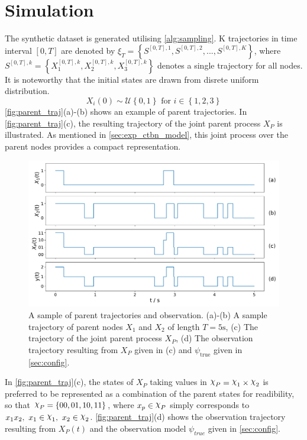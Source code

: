 \section{Simulation}
\label{sec:simulation}
The synthetic dataset is generated utilising \cref{alg:sampling}. K trajectories in time interval $ [0, T] $ are denoted by $ \xi_T = \left\lbrace S^{[0,T], 1}, S^{[0,T], 2}, ..., S^{[0,T], K} \right\rbrace  $, where $ S^{[0,T],k} = \left\lbrace X_1^{[0,T],k} , X_2^{[0,T],k}, X_3^{[0,T],k}\right\rbrace $ denotes a single trajectory for all nodes. It is noteworthy that the initial states are drawn from disrete uniform distribution.
\begin{equation}
X_i(0) \sim \mathcal{U} \left\lbrace 0, 1\right\rbrace  \text{ for } i \in \left\lbrace 1,2,3\right\rbrace 
\end{equation}
\autoref{fig:parent_traj}(a)-(b) shows an example of parent trajectories. In \autoref{fig:parent_traj}(c), the resulting trajectory of the joint parent process $ X_P $ is illustrated. As mentioned in \cref{sec:exp_ctbn_model}, this joint process over the parent nodes provides a compact representation. 
\begin{figure}[H]
	\begin{center}
		\includegraphics[width=.90\textwidth]{figures/sim_example/parent_traj}
		\caption[A sample of parent trajectories and observation]{A sample of parent trajectories and observation. (a)-(b) A sample trajectory of parent nodes $ X_1 $ and $ X_2 $ of length $ T=5\text{s} $, (c) The trajectory of the joint parent process $ X_P $, (d) The observation trajectory resulting from $ X_P $ given in (c) and $ \psi_{\text{true}} $ given in \cref{sec:config}.}
		\label{fig:parent_traj}
	\end{center}
\end{figure}
In \autoref{fig:parent_traj}(c), the states of $ X_P $ taking values in $ \rchi_P = \rchi_1 \times \rchi_2 $ is preferred to be represented as a combination of the parent states for readibility, so that $ \rchi_P = \left\lbrace 00, 01, 10, 11\right\rbrace  $, where $ x_p \in \rchi_P $ simply corresponds to $ x_1x_2,\ x_1\in \rchi_1,\  x_2\in \rchi_2 $. \autoref{fig:parent_traj}(d) shows the observation trajectory resulting from $ X_P(t) $ and the observation model $ \psi_{true} $ given in \cref{sec:config}. \\
